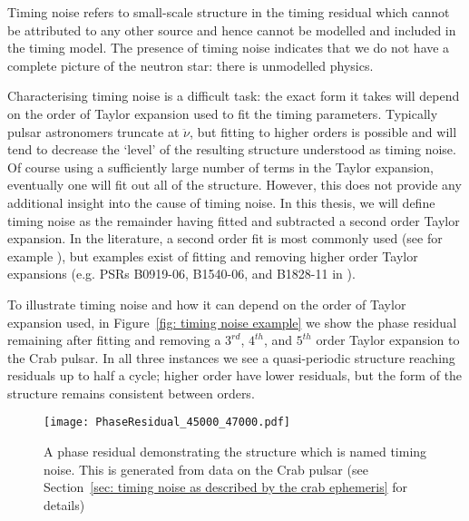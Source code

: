 Timing noise refers to small-scale structure in the timing residual which
cannot be attributed to any other source and hence cannot be modelled and
included in the timing model. The presence of timing noise indicates that we do
not have a complete picture of the neutron star: there is unmodelled physics.

Characterising timing noise is a difficult task: the exact form it takes will
depend on the order of Taylor expansion used to fit the timing parameters.
Typically pulsar astronomers truncate at $\ddot{\nu}$, but fitting to higher
orders is possible and will tend to decrease the `level' of the resulting
structure understood as timing noise. Of course using a sufficiently large
number of terms in the Taylor expansion, eventually one will fit out all of the
structure. However, this does not provide any additional insight into the cause
of timing noise. In this thesis, we will define timing noise as the remainder
having fitted and subtracted a second order Taylor expansion. In the
literature, a second order fit is most commonly used (see for example
\citet{Hobbs2010}), but examples exist of fitting and removing higher order
Taylor expansions (e.g. PSRs B0919-06, B1540-06, and B1828-11 in \citet{Lyne2010}).

To illustrate timing noise and how it can depend on the order of Taylor
expansion used, in Figure~\ref{fig: timing noise example} we show the phase
residual remaining after fitting and removing a $3^{rd}$, $4^{th}$, and
$5^{th}$ order Taylor expansion to the Crab pulsar. In all three instances we
see a quasi-periodic structure reaching residuals up to half a cycle; higher
order have lower residuals, but the form of the structure remains consistent
between orders.
\begin{figure}[htb]
\centering
\texttt{[image: PhaseResidual\_45000\_47000.pdf]}
\caption{A phase residual demonstrating the structure which is named timing
noise. This is generated from data on the Crab pulsar (see Section~\ref{sec:
timing noise as described by the crab ephemeris} for details)} \label{fig:
timing noise example} \end{figure}

